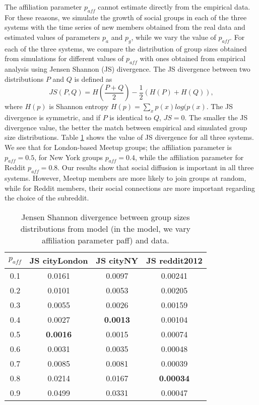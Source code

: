 The affiliation parameter $p_{aff}$ cannot estimate directly from the empirical data. For these reasons, we simulate the growth of social groups in each of the three systems with the time series of new members obtained from the real data and estimated values of parameters $p_a$ and $p_g$, while we vary the value of $p_{aff}$. For each of the three systems, we compare the distribution of group sizes obtained from simulations for different values of $p_{aff}$ with ones obtained from empirical analysis using Jensen Shannon (JS) divergence. The JS divergence \cite{jsdivergence} between two distributions $P$ and $Q$ is defined as 
\begin{equation}
JS(P, Q) = H\left(\frac{P+Q}{2}\right) - \frac{1}{2}\left(H(P)+H(Q)\right) \label{eq2},
\end{equation}
where $H(p)$ is Shannon entropy $H(p)=\sum_x p(x)log(p(x)$. The JS divergence is symmetric, and if $P$ is identical to $Q$, $JS=0$. The smaller the JS divergence value, the better the match between empirical and simulated group size distributions. Table \ref{tab:table} shows the value of JS divergence for all three systems. We see that for London-based Meetup groups; the affiliation parameter is $p_{aff}=0.5$, for New York groups $p_{aff}=0.4$, while the affiliation parameter for Reddit $p_{aff}=0.8$. Our results show that social diffusion is important in all three systems. However, Meetup members are more likely to join groups at random, while for Reddit members, their social connections are more important regarding the choice of the subreddit.  

\begin{table}[h]
	\centering
	\caption[Jensen Shannon divergence between group sizes distributions from model and data.]{Jensen Shannon divergence between group sizes distributions from model
		(in the model, we vary affiliation parameter paff) and data.}
	\begin{tabular}{|c|c|c|c|}
		\hline
		$p_{aff}$ & JS cityLondon   & JS cityNY       & JS reddit2012    \\ \hline
		0.1  & 0.0161          & 0.0097          & 0.00241          \\ \hline
		0.2  & 0.0101          & 0.0053          & 0.00205          \\ \hline
		0.3  & 0.0055          & 0.0026          & 0.00159          \\ \hline
		0.4  & 0.0027          & \textbf{0.0013} & 0.00104          \\ \hline
		0.5  & \textbf{0.0016} & 0.0015          & 0.00074          \\ \hline
		0.6  & 0.0031          & 0.0035          & 0.00048          \\ \hline
		0.7  & 0.0085          & 0.0081          & 0.00039          \\ \hline
		0.8  & 0.0214          & 0.0167          & \textbf{0.00034} \\ \hline
		0.9  & 0.0499          & 0.0331          & 0.00047          \\ \hline
	\end{tabular}
	
	\label{tab:table}
\end{table}

